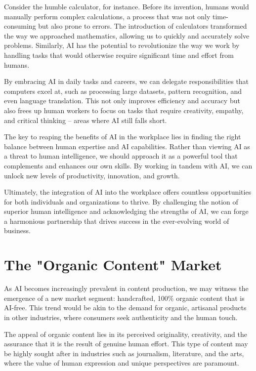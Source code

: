 Consider the humble calculator, for instance. Before its invention, humans would manually perform complex calculations, a process that was not only time-consuming but also prone to errors. The introduction of calculators transformed the way we approached mathematics, allowing us to quickly and accurately solve problems. Similarly, AI has the potential to revolutionize the way we work by handling tasks that would otherwise require significant time and effort from humans.

By embracing AI in daily tasks and careers, we can delegate responsibilities that computers excel at, such as processing large datasets, pattern recognition, and even language translation. This not only improves efficiency and accuracy but also frees up human workers to focus on tasks that require creativity, empathy, and critical thinking – areas where AI still falls short.

The key to reaping the benefits of AI in the workplace lies in finding the right balance between human expertise and AI capabilities. Rather than viewing AI as a threat to human intelligence, we should approach it as a powerful tool that complements and enhances our own skills. By working in tandem with AI, we can unlock new levels of productivity, innovation, and growth.

Ultimately, the integration of AI into the workplace offers countless opportunities for both individuals and organizations to thrive. By challenging the notion of superior human intelligence and acknowledging the strengths of AI, we can forge a harmonious partnership that drives success in the ever-evolving world of business.

\section{The "Organic Content" Market}

As AI becomes increasingly prevalent in content production, we may witness the emergence of a new market segment: handcrafted, 100\% organic content that is AI-free. This trend would be akin to the demand for organic, artisanal products in other industries, where consumers seek authenticity and the human touch.

The appeal of organic content lies in its perceived originality, creativity, and the assurance that it is the result of genuine human effort. This type of content may be highly sought after in industries such as journalism, literature, and the arts, where the value of human expression and unique perspectives are paramount.

